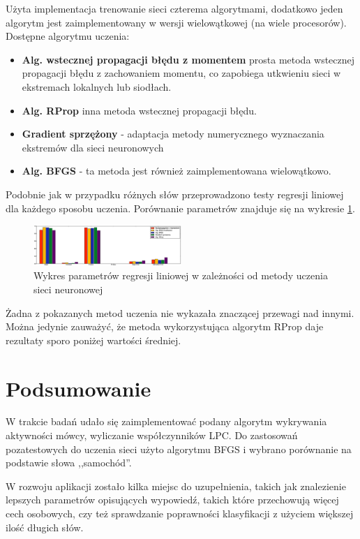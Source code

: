 \documentclass[journal]{IEEEtran}
\begin{document}
Użyta implementacja trenowanie sieci czterema algorytmami, dodatkowo jeden
algorytm jest zaimplementowany w wersji wielowątkowej (na wiele procesorów).
Dostępne algorytmu uczenia:
\begin{itemize}
    \item \textbf{Alg. wstecznej propagacji błędu z momentem} prosta metoda wstecznej
        propagacji błędu z zachowaniem momentu, co zapobiega utkwieniu sieci
        w ekstremach lokalnych lub siodłach.
    \item \textbf{Alg. RProp} inna metoda wstecznej propagacji błędu.
    \item \textbf{Gradient sprzężony} - adaptacja metody numerycznego wyznaczania
        ekstremów dla sieci neuronowych
    \item \textbf{Alg. BFGS} - ta metoda jest również zaimplementowana wielowątkowo.

\end{itemize}
Podobnie jak w przypadku różnych słów przeprowadzono testy regresji liniowej
dla każdego sposobu uczenia. Porównanie parametrów znajduje się na wykresie
\ref{fig:train}.


\begin{figure}[h!]
    \includegraphics[width=0.5\textwidth]{training_network_reggresion}
    \caption{Wykres parametrów regresji liniowej w zależności od metody uczenia
    sieci neuronowej}
    \label{fig:train}
\end{figure}

Żadna z pokazanych metod uczenia nie wykazała znaczącej przewagi nad innymi.
Można jedynie zauważyć, że metoda wykorzystująca algorytm RProp daje rezultaty
sporo poniżej wartości średniej.

\section{Podsumowanie}

W trakcie badań udało się zaimplementować podany algorytm wykrywania aktywności
mówcy, wyliczanie współczynników LPC. Do zastosowań pozatestowych do uczenia
sieci użyto algorytmu BFGS i wybrano porównanie na podstawie słowa ,,samochód''.

W rozwoju aplikacji zostało kilka miejsc do uzupełnienia, takich jak
znalezienie lepszych parametrów opisujących wypowiedź, takich które przechowują
więcej cech osobowych, czy też sprawdzanie poprawności klasyfikacji z użyciem
większej ilość długich słów.
\end{document}
